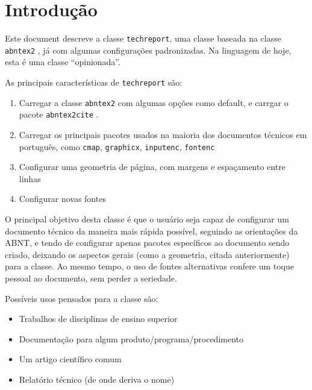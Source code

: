 \documentclass{techreport}
\renewcommand{\imprimircapa}{%
  \begin{capa}%
    
    \center
    {\ABNTEXchapterfont\Large\imprimirinstituicao}
    
    \vspace*{\fill}
    {\ABNTEXchapterfont\bfseries\LARGE\imprimirtitulo}
    \vspace*{\fill}

    \vspace*{\fill}
    {\ABNTEXchapterfont\large\imprimirautor}
    \vspace*{\fill}

    {\ABNTEXchapterfont\large\imprimirlocal}
    \par
    {\ABNTEXchapterfont\large\imprimirdata}

    \vspace*{1cm}

  \end{capa}
}
\newcommand{\trep}{\texttt{techreport}}
\begin{document}
\pretextual
\imprimircapa

\textual


\section{Introdução}
\label{sec:introducao}

Este document descreve a classe \trep, uma classe baseada na classe \texttt{abntex2} \cite{bib:abntex2classe} , já com algumas configurações padronizadas. Na linguagem de hoje, esta é uma classe ``opinionada''.

As principais características de \trep{} são:

\begin{enumerate}
\item Carregar a classe \texttt{abntex2} com algumas opções como default, e carrgar o pacote \texttt{abntex2cite} \cite{abntex2cite}.
\item Carregar os principais pacotes usados na maioria dos documentos técnicos em português, como \texttt{cmap}, \texttt{graphicx}, \texttt{inputenc}, \texttt{fontenc}
\item Configurar uma geometria de página, com margens e espaçamento entre linhas
\item Configurar novas fontes
\end{enumerate}

O principal objetivo desta classe é que o usuário seja capaz de configurar um documento técnico da maneira mais rápida possível, seguindo as orientações da ABNT, e tendo de configurar apenas pacotes específicos ao documento sendo criado, deixando os aspectos gerais (como a geometria, citada anteriormente) para a classe. Ao mesmo tempo, o uso de fontes alternativas confere um toque pessoal ao documento, sem perder a seriedade.

Possíveis usos pensados para a classe são:

\begin{itemize}
\item Trabalhos de disciplinas de ensino superior
\item Documentação para algum produto/programa/procedimento
\item Um artigo científico comum
\item Relatório técnico (de onde deriva o nome)
\end{itemize}
\end{document}
